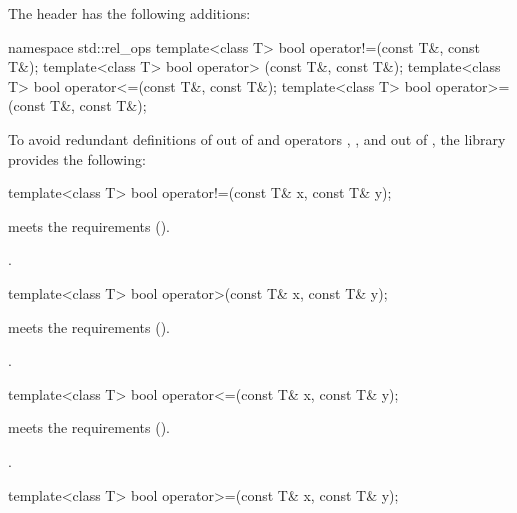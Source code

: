 \pnum
The header  has the following additions:

\begin{codeblock}
namespace std::rel_ops {
  template<class T> bool operator!=(const T&, const T&);
  template<class T> bool operator> (const T&, const T&);
  template<class T> bool operator<=(const T&, const T&);
  template<class T> bool operator>=(const T&, const T&);
}
\end{codeblock}

\pnum
To avoid redundant definitions of  out of 
and operators \tcode{>}, \tcode{<=}, and \tcode{>=} out of ,
the library provides the following:

%
\begin{itemdecl}
template<class T> bool operator!=(const T& x, const T& y);
\end{itemdecl}

\begin{itemdescr}
\pnum
\expects
{} meets the  requirements ().

\pnum
\returns
{}.
\end{itemdescr}

%
\begin{itemdecl}
template<class T> bool operator>(const T& x, const T& y);
\end{itemdecl}

\begin{itemdescr}
\pnum
\expects
{} meets the  requirements ().

\pnum
\returns
{}.
\end{itemdescr}

%
\begin{itemdecl}
template<class T> bool operator<=(const T& x, const T& y);
\end{itemdecl}

\begin{itemdescr}
\pnum
\expects
{} meets the  requirements ().

\pnum
\returns
{}.
\end{itemdescr}

%
\begin{itemdecl}
template<class T> bool operator>=(const T& x, const T& y);
\end{itemdecl}

